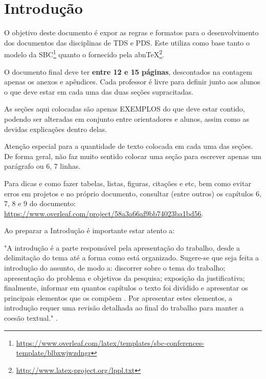 \documentclass[12pt,a4paper,chapter=TITLE,section=TITLE,subsection=TITLE,subsubsection=TITLE]{article}
\begin{document}
\textual

\section{Introdução}
O objetivo deste documento é expor as regras e formatos para o desenvolvimento dos documentos das disciplinas de TDS e PDS. Este utiliza como base tanto o modelo da SBC\footnote{\url{https://www.overleaf.com/latex/templates/sbc-conferences-template/blbxwjwzdngr}} quanto o fornecido pela abnTeX\footnote{\url{http://www.latex-project.org/lppl.txt}}.

O documento final deve ter \textbf{entre 12 e 15 páginas}, descontados na contagem apenas os anexos e apêndices. Cada professor é livre para definir junto aos alunos o que deve estar em cada uma das duas seções supracitadas.

As seções aqui colocadas são apenas EXEMPLOS do que deve estar contido, podendo ser alteradas em conjunto entre orientadores e alunos, assim como as devidas explicações dentro delas.

Atenção especial para a quantidade de texto colocada em cada uma das seções. De forma geral, não faz muito sentido colocar uma seção para escrever apenas um parágrafo ou 6, 7 linhas.

Para dicas e como fazer tabelas, listas, figuras, citações e etc, bem como evitar erros em projetos e no próprio documento, consultar (entre outros) os capítulos 6, 7, 8 e 9 do documento: \url{https://www.overleaf.com/project/58a3a66af9bb74023ba1bd56}.


Ao preparar a Introdução é importante estar atento a:
    \begin{citacao}
    "A introdução é a parte responsável pela apresentação do trabalho, desde a delimitação do tema até a forma como está organizado. Sugere-se que seja feita a introdução do assunto, de modo a: discorrer sobre o tema do trabalho; apresentação do problema e objetivos da pesquisa; exposição da justificativa; finalmente, informar em quantos capítulos o texto foi dividido e apresentar os principais elementos que os compõem . Por apresentar estes elementos, a introdução requer uma revisão detalhada ao final do trabalho para manter a coesão textual."  \cite{NormalizacaoIFSP}.
    \end{citacao}
\end{document}
